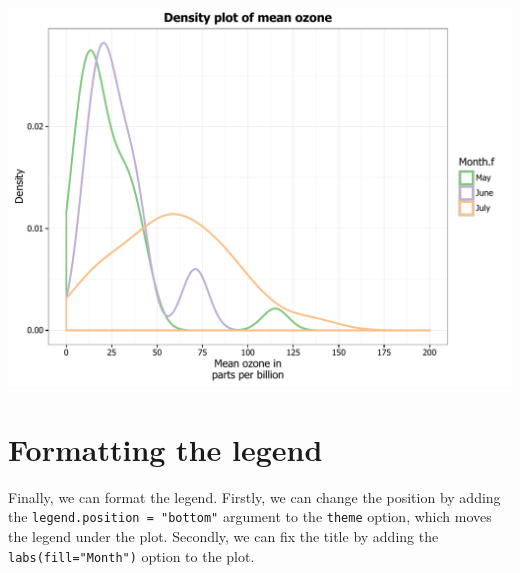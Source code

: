 \begin{center}\includegraphics[width=0.55\linewidth]{figures/density_18-1} \end{center}

\section{Formatting the legend}\label{formatting-the-legend-1}

Finally, we can format the legend. Firstly, we can change the position
by adding the \texttt{legend.position\ =\ "bottom"} argument to the
\texttt{theme} option, which moves the legend under the plot. Secondly,
we can fix the title by adding the \texttt{labs(fill="Month")} option to
the plot.

